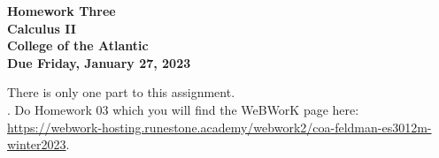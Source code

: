 \documentclass[12pt]{article}
\begin{document}
\pagestyle{empty}
 
\begin{center}
{\LARGE {\bf Homework Three}}\\
\bigskip
{\Large {\bf Calculus II}}\\
\bigskip
{\Large {\bf College of the Atlantic}}\\
\bigskip
{ {\bf Due Friday, January 27, 2023}}\\ 
\end{center}
\medskip


\noindent There is only one part to this assignment.\\

.  Do Homework 03 which you
will find the WeBWorK page here:
\url{https://webwork-hosting.runestone.academy/webwork2/coa-feldman-es3012m-winter2023}.





\end{document}
